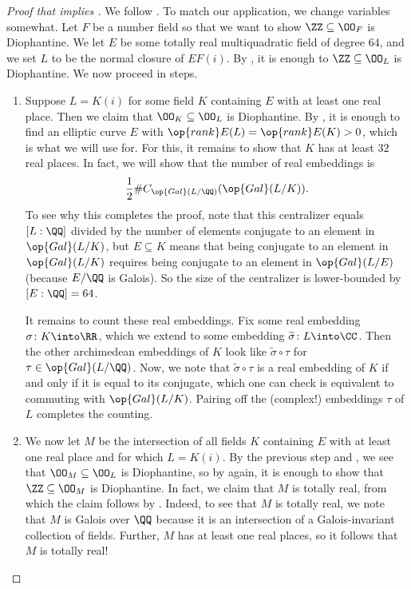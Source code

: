 \documentclass[../notes.tex]{subfiles}
\begin{document}
\begin{proof}[Proof that  implies ]
	We follow \cite[Theorem~2.6]{koymans-pagano-h10}. To match our application, we change variables somewhat. Let $F$ be a number field so that we want to show $\ZZ\subseteq\OO_F$ is Diophantine. We let $E$ be some totally real multiquadratic field of degree $64$, and we set $L$ to be the normal closure of $EF(i)$. By , it is enough to $\ZZ\subseteq\OO_L$ is Diophantine. We now proceed in steps.
	\begin{enumerate}
		\item Suppose $L=K(i)$ for some field $K$ containing $E$ with at least one real place. Then we claim that $\OO_K\subseteq\OO_L$ is Diophantine. By , it is enough to find an elliptic curve $E$ with $\op{rank}E(L)=\op{rank}E(K)>0$, which is what we will use  for. For this, it remains to show that $K$ has at least $32$ real places. In fact, we will show that the number of real embeddings is
		\[\frac12\#C_{\op{Gal}(L/\QQ)}(\op{Gal}(L/K)).\]
		To see why this completes the proof, note that this centralizer equals $[L:\QQ]$ divided by the number of elements conjugate to an element in $\op{Gal}(L/K)$, but $E\subseteq K$ means that being conjugate to an element in $\op{Gal}(L/K)$ requires being conjugate to an element in $\op{Gal}(L/E)$ (because $E/\QQ$ is Galois). So the size of the centralizer is lower-bounded by $[E:\QQ]=64$.

		It remains to count these real embeddings. Fix some real embedding $\sigma\colon K\into\RR$, which we extend to some embedding $\widetilde\sigma\colon L\into\CC$. Then the other archimedean embeddings of $K$ look like $\widetilde\sigma\circ\tau$ for $\tau\in\op{Gal}(L/\QQ)$. Now, we note that $\widetilde\sigma\circ\tau$ is a real embedding of $K$ if and only if it is equal to its conjugate, which one can check is equivalent to commuting with $\op{Gal}(L/K)$. Pairing off the (complex!) embeddings $\tau$ of $L$ completes the counting.

		\item We now let $M$ be the intersection of all fields $K$ containing $E$ with at least one real place and for which $L=K(i)$. By the previous step and , we see that $\OO_M\subseteq\OO_L$ is Diophantine, so by  again, it is enough to show that $\ZZ\subseteq\OO_M$ is Diophantine. In fact, we claim that $M$ is totally real, from which the claim follows by . Indeed, to see that $M$ is totally real, we note that $M$ is Galois over $\QQ$ because it is an intersection of a Galois-invariant collection of fields. Further, $M$ has at least one real places, so it follows that $M$ is totally real!
		\qedhere
	\end{enumerate}
\end{proof}
\end{document}
